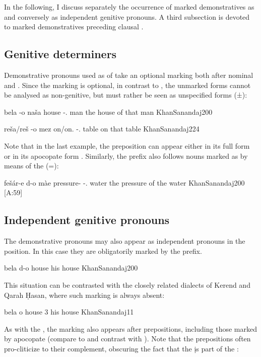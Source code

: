  In the following, I discuss separately the occurrence of \gen* marked demonstratives as  and conversely as independent genitive pronouns. A third subsection is devoted to \gen* marked demonstratives preceding clausal \secns.  

\subsection {Genitive determiners} 

Demonstrative pronouns used as  of \secns  take an optional \gen* marking both after nominal and  \prims. Since the marking is optional, in contrast to \JZax, the unmarked forms cannot be analysed as non-genitive, but must rather be seen as unspecified forms (±\gen):

{bela -o naša}
{house \opt{\gen}-\dem.\far{} man}
{the house of that man}
{KhanSanandaj}{200}

{reša/reš -o mez}
{on/on.\cst{} \opt{\gen}-\dem.\far{} table}
{on that table}
{KhanSanandaj}{224}

Note that in the last example, the preposition  can appear either in its full form or in its apocopate \cst* form . Similarly, the \gen* prefix also follows  \prim nouns marked as \cst* by means of the \ez* (=):

{fešár-e d-o màe}
{pressure-\ez{} \gen-\dem.\far{} water}
{the pressure of the water}
{KhanSanandaj}{200 {[A:59]}}

\subsection {Independent genitive pronouns}  
The demonstrative pronouns may also appear as independent pronouns in the \secn position. In this case  they are obligatorily marked by the \gen* prefix. 


{bela d-o}
{house \sg}
{his house}
{KhanSanandaj}{200}

This situation can be contrasted with the closely related dialects of Kerend and Qarah Ḥasan, where such marking is always absent:

{bela o}
{house 3\sg}
{his house}
{KhanSanandaj}{11}

As with the \gen* {}, the \gen* marking also appears  after prepositions, including those marked by apocopate \cst* (compare to  and contrast with ). Note that the prepositions often pro-cliticize to their complement, obscuring the fact that the \d is part of the \secn:

